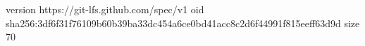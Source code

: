 version https://git-lfs.github.com/spec/v1
oid sha256:3df6f31f76109b60b39ba33dc454a6ce0bd41acc8c2d6f44991f815eeff63d9d
size 70
